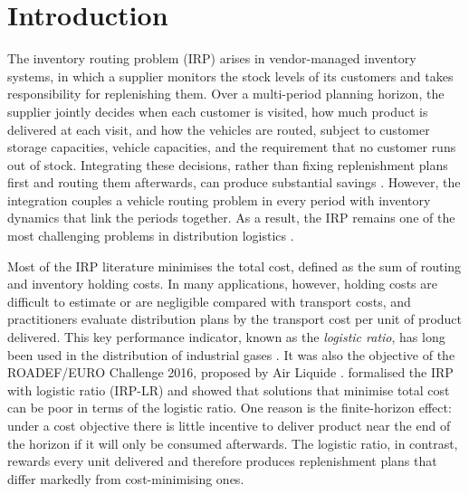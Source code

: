 
\section{Introduction}
\label{sec:introduction}

The inventory routing problem (IRP) arises in vendor-managed inventory
systems, in which a supplier monitors the stock levels of its customers and
takes responsibility for replenishing them. Over a multi-period planning
horizon, the supplier jointly decides when each customer is visited, how much
product is delivered at each visit, and how the vehicles are routed, subject
to customer storage capacities, vehicle capacities, and the requirement that
no customer runs out of stock. Integrating these decisions, rather than
fixing replenishment plans first and routing them afterwards, can produce
substantial savings \citep{archetti2016inventory}. However, the integration
couples a vehicle routing problem in every period with inventory dynamics
that link the periods together. As a result, the IRP remains one of the most
challenging problems in distribution logistics
\citep{moin2007overview,bertazzi2012inventory,coelho2014thirty,ekcsi2026inventory}.

Most of the IRP literature minimises the total cost, defined as the sum of
routing and inventory holding costs. In many applications, however, holding
costs are difficult to estimate or are negligible compared with transport
costs, and practitioners evaluate distribution plans by the transport cost
per unit of product delivered. This key performance indicator, known as the
\emph{logistic ratio}, has long been used in the distribution of industrial
gases \citep{bell1983improving,benoist2011randomized,singh2015incremental}.
It was also the objective of the ROADEF/EURO Challenge 2016, proposed by
Air Liquide \citep{andre2020roadef}. \citet{archetti2017logistic} formalised
the IRP with logistic ratio (IRP-LR) and showed that solutions that minimise
total cost can be poor in terms of the logistic ratio. One reason is the
finite-horizon effect: under a cost objective there is little incentive to
deliver product near the end of the horizon if it will only be consumed
afterwards. The logistic ratio, in contrast, rewards every unit delivered
and therefore produces replenishment plans that differ markedly from
cost-minimising ones.

